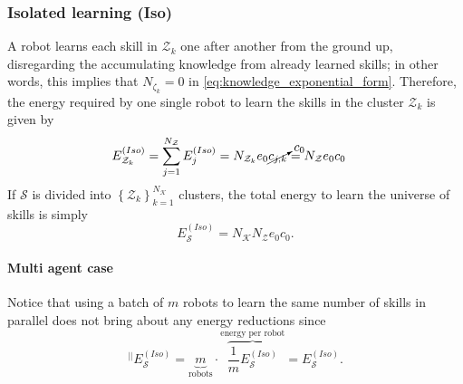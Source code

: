 \subsubsection{\textbf{Isolated learning (Iso)}} A robot learns each skill in $\mathcal{Z}_k$ one after another from the ground up, disregarding the accumulating knowledge from already learned skills; in other words, this implies that $N_{\mathcal{\zeta}_k} = 0$ in \eqref{eq:knowledge_exponential_form}. Therefore, the energy required by one single robot to learn the skills in the cluster $\mathcal{Z}_k$ is given by
 \begin{align}
     \begin{split}
       E^{(Iso)}_{\mathcal{Z}_k} &= \sum_{j=1}^{N_{\mathcal{Z}}} E^{(Iso)}_j= N_{\mathcal{Z}_k}  e_{0} \cancelto{c_{0}}{c_{j,k}} = N_{\mathcal{Z}} e_{0}  c_0
     \end{split}
 \end{align}
If $\mathcal{S}$ is divided into $\left\lbrace \mathcal{Z}_k \right\rbrace^{N_\mathcal{K}}_{k=1} $ clusters, the total energy to learn the universe of skills is simply
\begin{equation}
	E^{(Iso)}_{\mathcal{S}} = N_\mathcal{K} N_{\mathcal{Z}} e_{0}  c_0.
\end{equation}
\paragraph*{Multi agent case}
Notice that using a batch of $m$ robots to learn the same number of skills in parallel does not bring about any energy reductions since
\begin{equation}
    ^{\lvert \lvert}E^{(Iso)}_\mathcal{S}= \underbrace{m}_{\text{robots}}\cdot \overbrace{\frac{1}{m}E^{(Iso)}_\mathcal{S}}^{\text{energy per robot}} = E^{(Iso)}_\mathcal{S}.
\end{equation}



